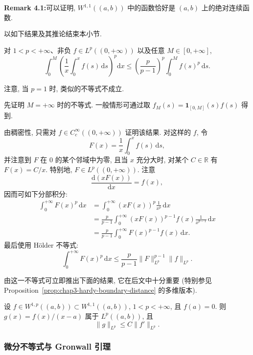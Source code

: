 \par\noindent\textbf{Remark 4.1:}\quad 可以证明, $W^{1,1}((a,b))$ 中的函数恰好是 $(a,b)$ 上的绝对连续函数.

以如下结果及其推论结束本小节.

\begin{Lemma}
\label{lem:chap2-hardy-one-dimensional}
对 $1<p<+\infty$、非负 $f\in L^p((0,+\infty))$ 以及任意 $M\in[0,+\infty]$,
\[
 \int_0^M\left(\frac1x\int_0^x f(s)\,\mathrm{d}s\right)^p\mathrm{d}x
 \leq\left(\frac{p}{p-1}\right)^p\int_0^M f(s)^p\,\mathrm{d}s.
\]
\end{Lemma}

注意, 当 $p=1$ 时, 类似的不等式不成立.

\begin{Proof}
先证明 $M=+\infty$ 时的不等式. 一般情形可通过取 $f_M(s)=\mathbf{1}_{[0,M]}(s)f(s)$ 得到.

由稠密性, 只需对 $f\in C_c^\infty((0,+\infty))$ 证明该结果. 对这样的 $f$, 令
\[
 F(x)=\frac1x\int_0^x f(s)\,\mathrm{d}s,
\]
并注意到 $F$ 在 $0$ 的某个邻域中为零, 且当 $x$ 充分大时, 对某个 $C\in\mathbb{R}$ 有 $F(x)=C/x$. 特别地, $F\in L^p((0,+\infty))$. 注意
\[
 \frac{\mathrm{d}(xF(x))}{\mathrm{d}x}=f(x),
\]
因而可如下分部积分:
\begin{align*}
 \int_0^{+\infty}F(x)^p\,\mathrm{d}x
 &=\int_0^{+\infty}(xF(x))^p\frac1{x^p}\,\mathrm{d}x\\
 &=\frac{p}{p-1}\int_0^{+\infty}(xF(x))^{p-1}f(x)\frac1{x^{p-1}}\,\mathrm{d}x\\
 &=\frac{p}{p-1}\int_0^{+\infty}F(x)^{p-1}f(x)\,\mathrm{d}x.
\end{align*}
最后使用 Hölder 不等式:
\[
 \int_0^{+\infty}F(x)^p\,\mathrm{d}x
 \leq\frac{p}{p-1}\|F\|_{L^p}^{p-1}\|f\|_{L^p}.
\]
\end{Proof}

由这一不等式可立即推出下面的结果, 它在后文中十分重要 (特别参见 Proposition~\ref{prop:chap3-hardy-boundary-distance} 的多维版本).

\begin{Corollary}
\label{cor:chap2-hardy-boundary-quotient}
设 $f\in W^{1,p}((a,b))\subset W^{1,1}((a,b))$, $1<p<+\infty$, 且 $f(a)=0$. 则 $g(x)=f(x)/(x-a)$ 属于 $L^p((a,b))$, 且
\[
 \|g\|_{L^p}\leq C\|f'\|_{L^p}.
\]
\end{Corollary}

\subsubsection{微分不等式与 Gronwall 引理}
\label{subsec:chap2-gronwall}

